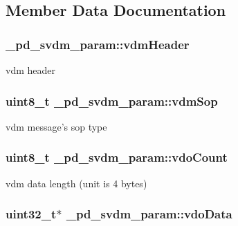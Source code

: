 \subsection{Member Data Documentation}
\hypertarget{struct__pd__svdm__param_aaebc50d834d15e862f264a4e4d8421b4}{
\subsubsection[{vdm\-Header}]{ \-\_\-pd\-\_\-svdm\-\_\-param\-::vdm\-Header}}\label{struct__pd__svdm__param_aaebc50d834d15e862f264a4e4d8421b4}
vdm header \hypertarget{struct__pd__svdm__param_a8047c38bf19593f6d467256b1696587e}{
\subsubsection[{vdm\-Sop}]{\setlength{\rightskip}{0pt plus 5cm}uint8\-\_\-t \-\_\-pd\-\_\-svdm\-\_\-param\-::vdm\-Sop}}\label{struct__pd__svdm__param_a8047c38bf19593f6d467256b1696587e}
vdm message's sop type \hypertarget{struct__pd__svdm__param_a153be4aa8e8fa9e41ac83eb41e513060}{
\subsubsection[{vdo\-Count}]{\setlength{\rightskip}{0pt plus 5cm}uint8\-\_\-t \-\_\-pd\-\_\-svdm\-\_\-param\-::vdo\-Count}}\label{struct__pd__svdm__param_a153be4aa8e8fa9e41ac83eb41e513060}
vdm data length (unit is 4 bytes) \hypertarget{struct__pd__svdm__param_a1da6696ea0b07e0173cc469094639e99}{
\subsubsection[{vdo\-Data}]{\setlength{\rightskip}{0pt plus 5cm}uint32\-\_\-t$\ast$ \-\_\-pd\-\_\-svdm\-\_\-param\-::vdo\-Data}}\label{struct__pd__svdm__param_a1da6696ea0b07e0173cc469094639e99}
